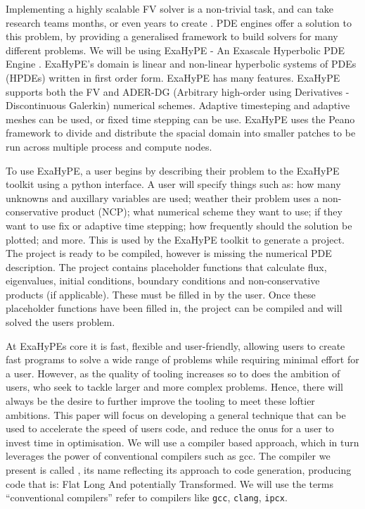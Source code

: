 Implementing a highly scalable FV solver is a non-trivial task, and can take research teams months, or even years to create \cite{tensorChemistry}.
PDE engines offer a solution to this problem, by providing a generalised framework to build solvers for many different problems.
We will be using ExaHyPE - An Exascale Hyperbolic PDE Engine \cite{exahype}.
ExaHyPE's domain is linear and non-linear hyperbolic systems of PDEs (HPDEs) written in first order form.
ExaHyPE has many features.
ExaHyPE supports both the FV and ADER-DG (Arbitrary high-order using Derivatives - Discontinuous Galerkin) numerical schemes.
Adaptive timesteping and adaptive meshes can be used, or fixed time stepping can be use. 
ExaHyPE uses the Peano framework \cite{PeanoFramework} to divide and distribute the spacial domain into smaller patches to be run across multiple process and compute nodes.

To use ExaHyPE, a user begins by describing their problem to the ExaHyPE toolkit using a python interface.
A user will specify things such as: how many unknowns and auxillary variables are used; weather their problem uses a non-conservative product (NCP); what numerical scheme they want to use; if they want to use fix or adaptive time stepping; how frequently should the solution be plotted; and more.
This is used by the ExaHyPE toolkit to generate a project.
The project is ready to be compiled, however is missing the numerical PDE description.
The project contains placeholder functions that calculate flux, eigenvalues, initial conditions, boundary conditions and non-conservative products (if applicable).   
These must be filled in by the user.
Once these placeholder functions have been filled in, the project can be compiled and will solved the users problem.


At ExaHyPEs core it is fast, flexible and user-friendly, allowing users to create fast programs to solve a wide range of problems while requiring minimal effort for a user.
However, as the quality of tooling increases so to does the ambition of users, who seek to tackle larger and more complex problems.
Hence, there will always be the desire to further improve the tooling to meet these loftier ambitions.
This paper will focus on developing a general technique that can be used to accelerate the speed of users code, and reduce the onus for a user to invest time in optimisation.
We will use a compiler based approach, which in turn leverages the power of conventional compilers such as gcc.
The compiler we present is called \phlat, its name reflecting its approach to code generation, producing code that is: Flat Long And potentially Transformed. 
We will use the terms ``conventional compilers'' refer to compilers like \texttt{gcc}, \texttt{clang}, \texttt{ipcx}.  


